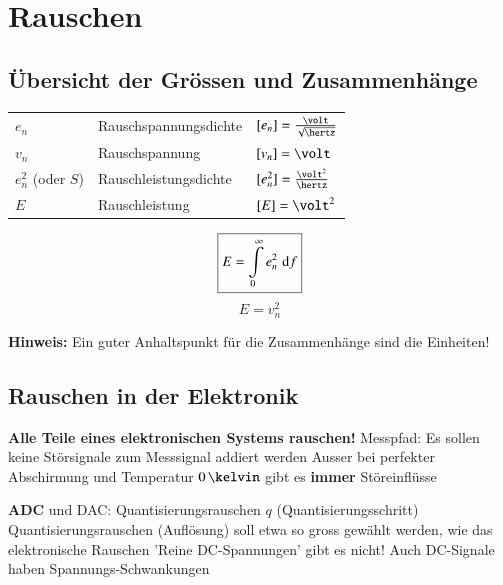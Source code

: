 \section{Rauschen}

\subsection{Übersicht der Grössen und Zusammenhänge}

\begin{minipage}[c]{0.7\columnwidth}
    \begin{tabular}{lll}
        $e_n$               & Rauschspannungsdichte & $[e_n] = \frac{\volt}{\sqrt{\hertz}}$ \\
        $v_n$               & Rauschspannung        & $[v_n] = \volt$ \\
        $e_n^2$ (oder $S$)  & Rauschleistungsdichte & $[e_n^2] = \frac{\volt^2}{\hertz}$ \\
        $E$                 & Rauschleistung        & $[E] = \volt^2$ \\
    \end{tabular}
\end{minipage}
\hfill
\begin{minipage}[c]{0.28\columnwidth}
    $$ \boxed{ E = \int\limits_{0}^{\infty} e_n^2 \, \mathop{} \! \mathrm{d} f } $$
    $$ \boxed{ E =  v_n^2 } $$
\end{minipage}

\vspace{0.2cm}
\textbf{Hinweis:} Ein guter Anhaltspunkt für die Zusammenhänge sind die Einheiten!


\subsection{Rauschen in der Elektronik}

\begin{outline}
    \1 \textbf{Alle Teile eines elektronischen Systems rauschen!}
    \1 Messpfad: Es sollen keine Störsignale zum Messsignal addiert werden
        \2 Ausser bei perfekter Abschirmung und Temperatur $0 \, \kelvin$ gibt es \textbf{immer} Störeinflüsse
\end{outline}

\vfill\null
\columnbreak

\begin{outline}
    \1 \textbf{ADC} und DAC: Quantisierungsrauschen $q$ (Quantisierungsschritt)
        \2 Quantisierungsrauschen (Auflösung) soll etwa so gross gewählt werden, wie das elektronische Rauschen
    \1 'Reine DC-Spannungen' gibt es nicht!
        \2 Auch DC-Signale haben Spannungs-Schwankungen
\end{outline}


